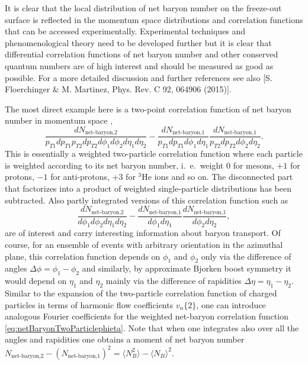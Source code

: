 It is clear that the local distribution of net baryon number on the freeze-out surface is reflected in the momentum space distributions and correlation functions that can be accessed experimentally. Experimental techniques and phenomenological theory need to be developed further but it is clear that differential correlation functions of net baryon number and other conserved quantum numbers are of high interest and should be measured as good as possible. For a more detailed discussion and further references see also [S. Floerchinger \& M. Martinez, Phys. Rev. C 92, 064906 (2015)].

The most direct example here is a two-point correlation function of net baryon number in momentum space \cite{Floerchinger:2015efa},
\begin{equation}
\frac{dN_\text{net-baryon,2}}{p_{T1} dp_{T1} p_{T2} dp_{T2}d\phi_1d\phi_2d\eta_1 d\eta_2} - \frac{dN_\text{net-baryon,1}}{p_{T1} dp_{T1} d\phi_1d\eta_1}  \frac{dN_\text{net-baryon,1}}{p_{T2} dp_{T2} d\phi_2d\eta_2}.
\end{equation}
This is essentially a weighted two-particle correlation function where each particle is weighted according to its net baryon number, i.\ e.\ weight $0$ for mesons, $+1$ for protons, $-1$ for anti-protons, $+3$ for $^3\text{He}$ ions and so on. The disconnected part that factorizes into a product of weighted single-particle distributions has been subtracted. Also partly integrated versions of this correlation function such as
\begin{equation}
\frac{dN_\text{net-baryon,2}}{d\phi_1d\phi_2d\eta_1 d\eta_2} - \frac{dN_\text{net-baryon,1}}{d\phi_1d\eta_1} \frac{dN_\text{net-baryon,1}}{d\phi_2d\eta_2} ,
\label{eq:netBaryonTwoParticlephieta}
\end{equation}
are of interest and carry interesting information about baryon transport. Of course, for an ensemble of events with arbitrary orientation in the azimuthal plane, this correlation function depends on $\phi_1$ and $\phi_2$ only via the difference of angles $\Delta\phi=\phi_1-\phi_2$ and similarly, by approximate Bjorken boost symmetry it would depend on $\eta_1$ and $\eta_2$ mainly via the difference of rapidities $\Delta\eta = \eta_1-\eta_2$. Similar to the expansion of the two-particle correlation function of charged particles in terms of harmonic flow coefficients $v_n\{2\}$, one can introduce analogous Fourier coefficients for the weighted net-baryon correlation function \eqref{eq:netBaryonTwoParticlephieta}. Note that when one integrates also over all the angles and rapidities one obtains a moment of net baryon number $N_\text{net-baryon,2}-(N_\text{net-baryon,1})^2=\langle N_B^2 \rangle - \langle  N_B \rangle^2$. 

